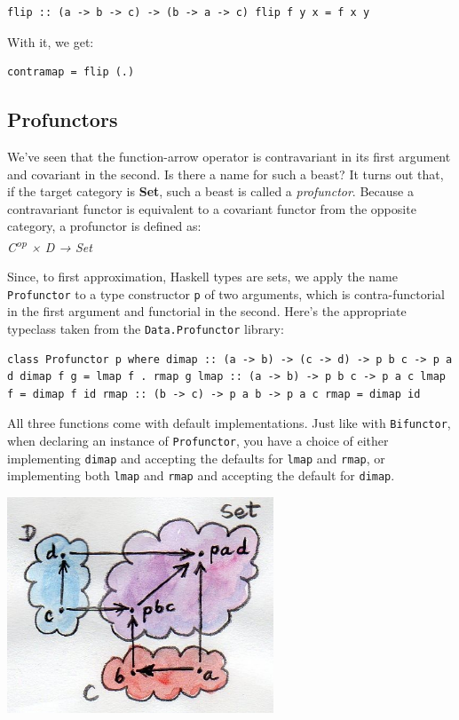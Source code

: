 \begin{verbatim}
flip :: (a -> b -> c) -> (b -> a -> c) flip f y x = f x y
\end{verbatim}

With it, we get:

\begin{verbatim}
contramap = flip (.)
\end{verbatim}

\subsection{Profunctors}\label{profunctors}

We've seen that the function-arrow operator is contravariant in its
first argument and covariant in the second. Is there a name for such a
beast? It turns out that, if the target category is \textbf{Set}, such a
beast is called a \emph{profunctor}. Because a contravariant functor is
equivalent to a covariant functor from the opposite category, a
profunctor is defined as:\\
\emph{C\textsuperscript{op} × D → Set}

Since, to first approximation, Haskell types are sets, we apply the name
\texttt{Profunctor} to a type constructor \texttt{p} of two arguments,
which is contra-functorial in the first argument and functorial in the
second. Here's the appropriate typeclass taken from the
\texttt{Data.Profunctor} library:

\begin{verbatim}
class Profunctor p where dimap :: (a -> b) -> (c -> d) -> p b c -> p a d dimap f g = lmap f . rmap g lmap :: (a -> b) -> p b c -> p a c lmap f = dimap f id rmap :: (b -> c) -> p a b -> p a c rmap = dimap id
\end{verbatim}

All three functions come with default implementations. Just like with
\texttt{Bifunctor}, when declaring an instance of \texttt{Profunctor},
you have a choice of either implementing \texttt{dimap} and accepting
the defaults for \texttt{lmap} and \texttt{rmap}, or implementing both
\texttt{lmap} and \texttt{rmap} and accepting the default for
\texttt{dimap}.

\hypertarget{attachment_4078}{}
\includegraphics[width=3.12500in]{images/dimap.jpg}

